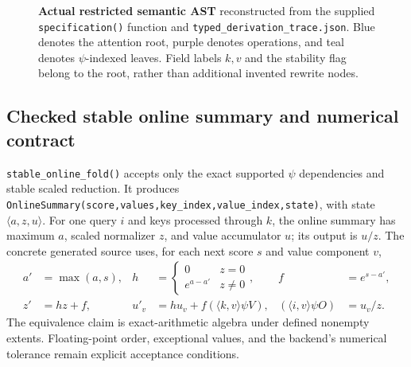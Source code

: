 \documentclass[11pt]{article}
\begin{document}
\begin{figure}[p]\centering
{}
\caption{\textbf{Actual restricted semantic AST} reconstructed from the supplied
\texttt{specification()} function and \texttt{typed\_derivation\_trace.json}.
Blue denotes the attention root, purple denotes operations, and teal denotes
$\psi$-indexed leaves. Field labels $k,v$ and the stability flag belong to the
root, rather than additional invented rewrite nodes.}
\label{fig:actual-typed-ast}
\end{figure}

\subsection{Checked stable online summary and numerical contract}
\texttt{stable\_online\_fold()} accepts only the exact supported $\psi$
dependencies and stable scaled reduction. It produces
\texttt{OnlineSummary(score,values,key\_index,value\_index,state)},
with state $\langle a,z,u\rangle$. For one query $i$ and keys processed
through $k$, the online summary has maximum $a$, scaled normalizer $z$,
and value accumulator $u$; its output is $u/z$. The concrete generated
source uses, for each next score $s$ and value component $v$,
\begin{align}
 a'&=\max(a,s), & h&=\begin{cases}0&z=0\\e^{a-a'}&z\ne0\end{cases},
 & f&=e^{s-a'},\\
 z'&=hz+f, & u'_v&=h u_v+f(\langle k,v\rangle\psi V),
 & (\langle i,v\rangle\psi O)&=u_v/z.
\end{align}
The equivalence claim is exact-arithmetic algebra under defined nonempty
extents. Floating-point order, exceptional values, and the backend's
numerical tolerance remain explicit acceptance conditions.
\end{document}

